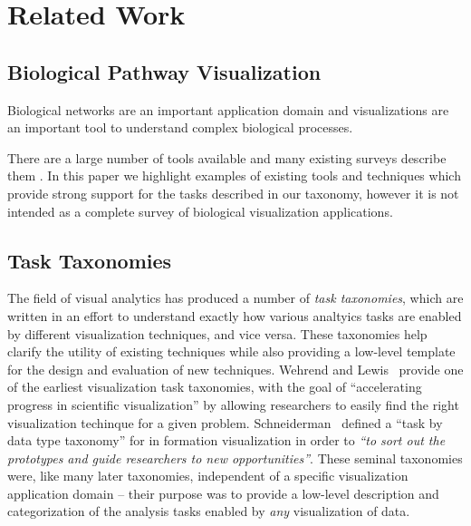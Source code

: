 \documentclass{egpubl}
\begin{document}
\section{Related Work}
\subsection{Biological Pathway Visualization}
Biological networks are an important application domain and visualizations are an important tool to understand complex biological processes.

There are a large number of tools available and many existing surveys describe them \cite{Suderman2007tools,pavlopoulos2008survey,Gehlenborg2010omics}.
In this paper we highlight examples of existing tools and techniques which provide strong support for the tasks described in our taxonomy, however it is not intended as a complete survey of biological visualization applications.




\subsection{Task Taxonomies}
The field of visual analytics has produced a number of \textit{task taxonomies}, which are written in an effort to understand exactly how various analtyics tasks are enabled by different visualization techniques, and vice versa. These taxonomies help clarify the utility of existing techniques while also providing a low-level template for the design and evaluation of new techniques.
Wehrend and Lewis~\cite{Wehrend1990} provide one of the earliest visualization task taxonomies, with the goal of ``accelerating progress in scientific visualization'' by allowing researchers to easily find the right visualization techinque for a given problem.
Schneiderman~\cite{Shneiderman1996} defined a ``task by data type taxonomy'' for in formation visualization in order to \textit{``to sort out the prototypes and guide researchers to new opportunities''}.
These seminal taxonomies were, like many later taxonomies, independent of a specific visualization application domain --
their purpose was to provide a low-level description and categorization of the analysis tasks enabled by \textit{any} visualization of data.
\end{document}
